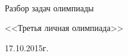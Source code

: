 \begin{titlepage}
\newpage
{}

~\vspace{5cm}

\Large{Разбор задач олимпиады}

\Large{<<Третья личная олимпиада>>}

\Large{17.10.2015г.}

\end{titlepage}
